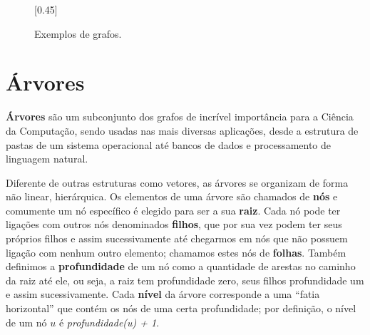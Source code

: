 \begin{figure}
{
  }
    [0.45\textwidth]{
  }
  \caption{Exemplos de grafos.\label{fig:subfigures}}
\end{figure}

\section{Árvores}

\textbf{Árvores} são um subconjunto dos grafos de incrível importância para a
Ciência da Computação, sendo usadas nas mais diversas aplicações, desde a estrutura
de pastas de um sistema operacional até bancos de dados e processamento de
linguagem natural.

Diferente de outras estruturas como vetores, as árvores se organizam de forma
não linear, hierárquica. Os elementos de uma árvore são chamados de \textbf{nós} e
comumente um nó específico é elegido para ser a sua \textbf{raiz}. Cada nó pode
ter ligações com outros nós denominados \textbf{filhos}, que por sua vez podem
ter seus próprios filhos e assim sucessivamente até chegarmos em nós que não
possuem ligação com nenhum outro elemento; chamamos estes nós de \textbf{folhas}.
Também definimos a \textbf{profundidade} de um nó como a quantidade de arestas no
caminho da raiz até ele, ou seja, a raiz tem profundidade zero, seus filhos
profundidade um e assim sucessivamente. Cada \textbf{nível} da árvore corresponde a
uma ``fatia horizontal'' que contém os nós de uma certa profundidade; por definição, o
nível de um nó $u$ é \textit{profundidade(u) + 1}.

